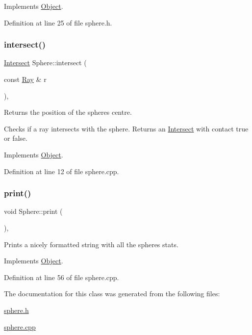 Implements \mbox{\hyperlink{class_object_ac29e04a255155b791d69b97820423efa}{Object}}.



Definition at line 25 of file sphere.\+h.

\mbox{\label{class_sphere_a8d2ea6e36b5c23330e08861bb723e2a4}} 
\subsubsection{\texorpdfstring{intersect()}{intersect()}}
{\footnotesize\ttfamily \mbox{\hyperlink{struct_intersect}{Intersect}} Sphere\+::intersect (\begin{DoxyParamCaption}\item[{const \mbox{\hyperlink{struct_ray}{Ray}} \&}]{r }\end{DoxyParamCaption})\hspace{0.3cm}{\ttfamily [override]}, {\ttfamily [virtual]}}



Returns the position of the sphere\textquotesingle{}s centre. 

Checks if a ray intersects with the sphere. Returns an \mbox{\hyperlink{struct_intersect}{Intersect}} with contact true or false. 

Implements \mbox{\hyperlink{class_object_a27b26f69f1fcb4dc72eca40ac0d20ea6}{Object}}.



Definition at line 12 of file sphere.\+cpp.

\mbox{\label{class_sphere_a95537121c5308b7b250f4a53171303ef}} 
\subsubsection{\texorpdfstring{print()}{print()}}
{\footnotesize\ttfamily void Sphere\+::print (\begin{DoxyParamCaption}{ }\end{DoxyParamCaption})\hspace{0.3cm}{\ttfamily [override]}, {\ttfamily [virtual]}}



Prints a nicely formatted string with all the sphere\textquotesingle{}s stats. 



Implements \mbox{\hyperlink{class_object_ad81452e5a38455eff025d85ef1da7307}{Object}}.



Definition at line 56 of file sphere.\+cpp.



The documentation for this class was generated from the following files\+:\begin{DoxyCompactItemize}
\item 
\mbox{\hyperlink{sphere_8h}{sphere.\+h}}\item 
\mbox{\hyperlink{sphere_8cpp}{sphere.\+cpp}}\end{DoxyCompactItemize}
